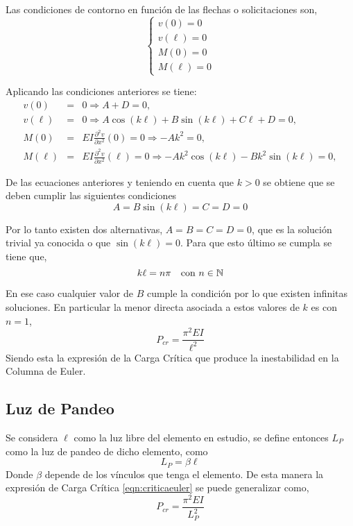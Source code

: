 Las condiciones de contorno en función de las flechas o solicitaciones son,
%
\begin{equation}
\left\{
\begin{array}{l}
v(0)=0 \\[.5em]
\displaystyle v(\ell)=0\\[.5em]
M(0)=0\\[.5em]
M(\ell)=0
\end{array}
\right.
\end{equation}

Aplicando las condiciones anteriores se tiene:
%
\begin{eqnarray}
v(0) &=& 0 \Rightarrow A + D = 0, \\
v(\ell) &=& 0 \Rightarrow A \cos(k \ell) + B \sin(k \ell) + C \ell + D = 0, \\
M(0) &=& EI \frac {\partial^2 v}{\partial x^2} (0) = 0 \Rightarrow -Ak^2 = 0,  \\
M(\ell) &=& EI \frac{\partial^2 v}{\partial x^2} (\ell) = 0  \Rightarrow -Ak^2\cos(k \ell) -  B k^2 \sin(k\ell) = 0,
\end{eqnarray}

De las ecuaciones anteriores y teniendo en cuenta que $k>0$ se obtiene que se deben cumplir las siguientes condiciones
\begin{equation}
A = B\sin(k\ell) = C = D = 0
\end{equation}

Por lo tanto existen dos alternativas, $A = B = C = D = 0$, que es la solución trivial ya conocida o que $\sin(k\ell) = 0$.
Para que esto último se cumpla se tiene que,
\begin{equation}
k \ell = n \pi  \quad \text{con} \,\, n\in {\mathbb N}
\end{equation}

En ese caso cualquier valor de $B$ cumple la condición por lo que existen infinitas soluciones. En particular la menor directa asociada a estos valores de $k$ es con $n=1$,
\begin{equation}\label{eqn:criticaeuler}
\boxed{P_{cr} = \frac{\pi^2 E I}{\ell^2}}
\end{equation}
Siendo esta la expresión de la Carga Crítica que produce la inestabilidad en la Columna de Euler.

\subsection{Luz de Pandeo}

Se considera $\ell$ como la luz libre del elemento en estudio, se define entonces $L_P$ como la luz de pandeo de dicho elemento, como
\begin{equation}
L_P=\beta\ell
\end{equation}
Donde $\beta$ depende de los vínculos que tenga el elemento. De esta manera la expresión de Carga Crítica \eqref{eqn:criticaeuler} se puede generalizar como,
\begin{equation}\label{eqn:criticageneral}
\boxed{P_{cr} = \frac{\pi^2 E I}{L_P^2}}
\end{equation}

